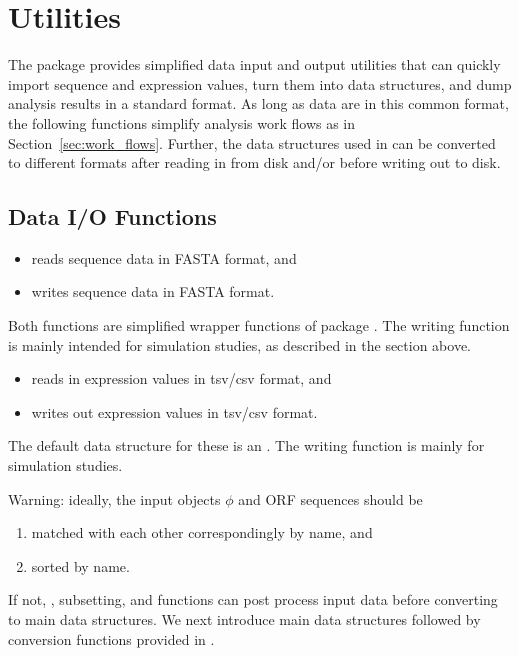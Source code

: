 
\section[Utilities]{Utilities}
\label{sec:utilities}

The  package provides simplified data input and output utilities 
that can quickly import sequence and expression values, turn them into
 data structures, and dump analysis results in a standard format.
As long as data are in this common format, the following functions simplify
analysis work flows as in Section~\ref{sec:work_flows}.
Further, the  data structures used in  can be
converted to different formats after reading in from disk and/or
before writing out to disk.


\subsection[Data I/O Functions]{Data I/O Functions}
\label{sec:data_io}

\begin{itemize}
\item {} reads sequence data in FASTA format, and
\item {} writes sequence data in FASTA format.
\end{itemize}
Both functions are simplified wrapper functions of package .
The writing function is mainly intended for simulation studies, as described in 
the section above.

\begin{itemize}
\item {} reads in expression values in tsv/csv format, and
\item {} writes out expression values in tsv/csv format.
\end{itemize}
The default data structure for these is an  .
The writing function is mainly for simulation studies.

{\color{red}Warning:}
ideally, the input objects $\phi$ and ORF sequences should be
\begin{enumerate}
\item matched with each other correspondingly by name, and
\item sorted by name.
\end{enumerate}
If not, , subsetting, and  functions can
post process input data before converting to main data structures.
We next introduce main data structures followed by conversion functions
provided in .


